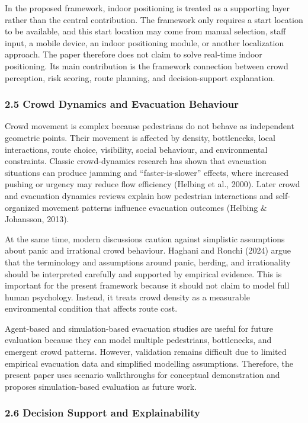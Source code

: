 \documentclass[
]{article}
\begin{document}
In the proposed framework, indoor positioning is treated as a supporting
layer rather than the central contribution. The framework only requires
a start location to be available, and this start location may come from
manual selection, staff input, a mobile device, an indoor positioning
module, or another localization approach. The paper therefore does not
claim to solve real-time indoor positioning. Its main contribution is
the framework connection between crowd perception, risk scoring, route
planning, and decision-support explanation.

\subsubsection{2.5 Crowd Dynamics and Evacuation
Behaviour}\label{crowd-dynamics-and-evacuation-behaviour}

Crowd movement is complex because pedestrians do not behave as
independent geometric points. Their movement is affected by density,
bottlenecks, local interactions, route choice, visibility, social
behaviour, and environmental constraints. Classic crowd-dynamics
research has shown that evacuation situations can produce jamming and
``faster-is-slower'' effects, where increased pushing or urgency may
reduce flow efficiency (Helbing et al., 2000). Later crowd and
evacuation dynamics reviews explain how pedestrian interactions and
self-organized movement patterns influence evacuation outcomes (Helbing
\& Johansson, 2013).

At the same time, modern discussions caution against simplistic
assumptions about panic and irrational crowd behaviour. Haghani and
Ronchi (2024) argue that the terminology and assumptions around panic,
herding, and irrationality should be interpreted carefully and supported
by empirical evidence. This is important for the present framework
because it should not claim to model full human psychology. Instead, it
treats crowd density as a measurable environmental condition that
affects route cost.

Agent-based and simulation-based evacuation studies are useful for
future evaluation because they can model multiple pedestrians,
bottlenecks, and emergent crowd patterns. However, validation remains
difficult due to limited empirical evacuation data and simplified
modelling assumptions. Therefore, the present paper uses scenario
walkthroughs for conceptual demonstration and proposes simulation-based
evaluation as future work.

\subsubsection{2.6 Decision Support and
Explainability}\label{decision-support-and-explainability}
\end{document}
